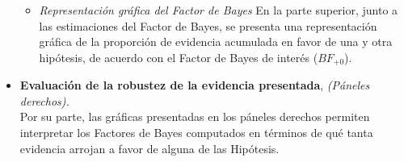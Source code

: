 \begin{itemize}
\begin{itemize}
	\item \textit{Representación gráfica del Factor de Bayes} En la parte superior, junto a las estimaciones del Factor de Bayes, se presenta una representación gráfica de la proporción de evidencia acumulada en favor de una y otra hipótesis, de acuerdo con el Factor de Bayes de interés ($BF_{+0}$).\\
\end{itemize}

\item \textbf{Evaluación de la robustez de la evidencia presentada}, \textit{(Páneles derechos).}\\

Por su parte, las gráficas presentadas en los páneles derechos permiten interpretar los Factores de Bayes computados en términos de qué tanta evidencia arrojan a favor de alguna de las Hipótesis.\\

\end{itemize}

